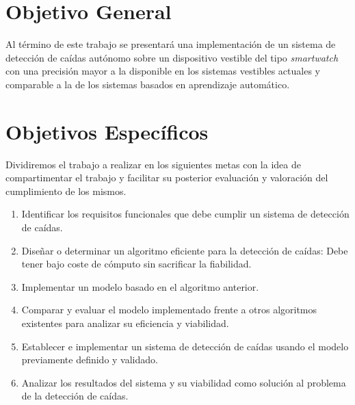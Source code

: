 \begin{comment}
Puente entre el estudio y la contribución. Debe contener:
 * objetivo general
 * objetivo específico
 * metodología de trabajo
 
Los objetivos deben ser \textit{SMART}

Specificl (objetivo claro)
Measurable (se pueda medir el éxito o fracaso)
Attainable (viable su conecución con el tiempo y recursos disponibles)
Relevant (que tenga un impacto demostrable)
Time-related (que se pueda realizar en un tiempo determinado)
\end{comment}

\section{Objetivo General}\label{sec:obj:objetivo_general}

Al término de este trabajo se presentará una implementación de un sistema de detección de caídas autónomo sobre un dispositivo vestible del tipo \textit{smartwatch} con una precisión mayor a la disponible en los sistemas vestibles actuales y comparable a la de los sistemas basados en aprendizaje automático.

\section{Objetivos Específicos}\label{sec:obj:objetivos_especificos}

Dividiremos el trabajo a realizar en los siguientes metas con la idea de compartimentar el trabajo y facilitar su posterior evaluación y valoración del cumplimiento de los mismos.

\begin{enumerate}
  \item Identificar los requisitos funcionales que debe cumplir un sistema de detección de caídas.
  \item Diseñar o determinar un algoritmo eficiente para la detección de caídas: Debe tener bajo coste de cómputo sin sacrificar la fiabilidad.
  \item Implementar un modelo basado en el algoritmo anterior.
  \item Comparar y evaluar el modelo implementado frente a otros algoritmos existentes para analizar su eficiencia y viabilidad.
  \item Establecer e implementar un sistema de detección de caídas usando el modelo previamente definido y validado.
  \item Analizar los resultados del sistema y su viabilidad como solución al problema de la detección de caídas.

\end{enumerate}

